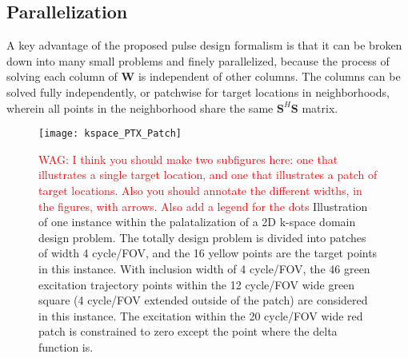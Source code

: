 \subsection*{Parallelization}
\par A key advantage of the proposed pulse design formalism is that it can be broken down into many small problems and finely parallelized, because the process of solving each column of $\bm{W}$ is independent of other columns. The columns can be solved fully independently, or patchwise for target locations in neighborhoods, wherein all points in the neighborhood share the same $\bm{S}^{H}\bm{S}$ matrix. 
\begin{figure}
	\centering
	\texttt{[image: kspace\_PTX\_Patch]}
	\caption{\textcolor{red}{WAG: I think you should make two subfigures here: one that illustrates a single target location, and one that illustrates a patch of target locations. Also you should annotate the different widths, in the figures, with arrows. Also add a legend for the dots} 
	Illustration of one instance within the palatalization of a 2D k-space domain design problem. The totally design problem is divided into patches of width 4 cycle/FOV, and the 16 yellow points are the target points in this instance. With inclusion width of 4 cycle/FOV, the 46 green excitation trajectory points within the 12 cycle/FOV wide green square (4 cycle/FOV extended outside of the patch) are considered in this instance. The excitation within the 20 cycle/FOV wide red patch is constrained to zero except the point where the delta function is.}
	\label{fig:Patch}
\end{figure}
